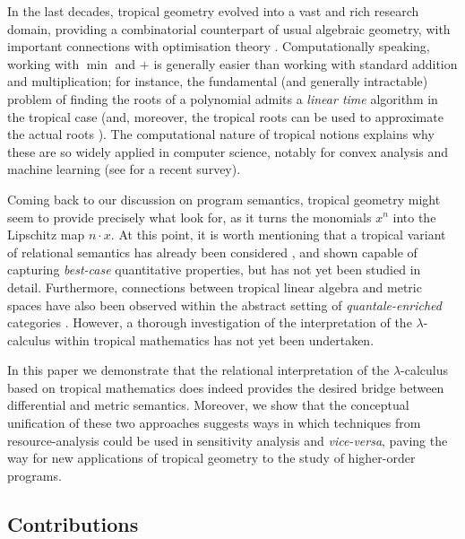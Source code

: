 In the last decades, tropical geometry evolved into a vast and rich research domain, providing a combinatorial counterpart of usual algebraic geometry, with important connections with optimisation theory \cite{Sturmfelds}.
Computationally speaking, working with $\min$ and $+$ is generally easier than working with standard addition and multiplication; for instance, the fundamental (and generally intractable) problem of finding the roots of a polynomial admits a \emph{linear time} algorithm in the tropical case (and, moreover,  the tropical roots can be used to approximate the actual roots \cite{Noferini2015}).
The computational nature of tropical notions explains why these are so widely applied in computer science, notably for convex analysis and machine learning (see \cite{Maragos2021} for a recent survey).

Coming back to our discussion on program semantics, tropical geometry might seem to provide precisely what look for, as it turns the monomials $x^{n}$ into the Lipschitz map  $n\cdot x$.
At this point, it is worth mentioning that a tropical variant of relational semantics has already been considered \cite{Manzo2013}, and shown capable of capturing \emph{best-case} quantitative properties, but has not yet been studied in detail. Furthermore, connections between tropical linear algebra and metric spaces have also been observed \cite{Fuji} within the abstract setting of \emph{quantale-enriched} categories \cite{Hofmann2014, Stubbe2014}.
However, a thorough investigation of the interpretation of the $\lambda$-calculus within tropical mathematics has not yet been undertaken. 

In this paper we demonstrate that the relational interpretation of the $\lambda$-calculus based on tropical mathematics does indeed provides the desired bridge between differential and metric semantics. Moreover, we show that the conceptual unification of these two approaches suggests ways in which techniques from resource-analysis could be used in sensitivity analysis and \emph{vice-versa}, paving the way for new  applications of tropical geometry to the  study of higher-order programs.


\subsection{Contributions}

